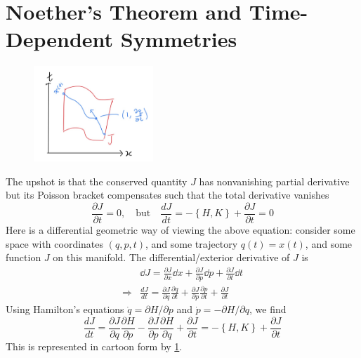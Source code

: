 \documentclass{report}
\begin{document}
\section{Noether's Theorem and Time-Dependent Symmetries}
\begin{figure}
	\begin{center}
		\includegraphics[width=0.4\textwidth]{figs/september/IMG_0030.jpg}
		\caption{}
		\label{fig:poisson}
	\end{center}
	\vspace*{-4em}
\end{figure}
The upshot is that the conserved quantity $ J $ has nonvanishing partial 
derivative but its Poisson bracket compensates such that the total derivative 
vanishes
\begin{equation*}
	\frac{\partial J}{\partial t} = 0,
	\quad\text{but}\quad
	\frac{d J}{d t} = -\left\{H, K\right\} + \frac{\partial J}{\partial t}= 0
\end{equation*}
Here is a differential geometric way of viewing the above equation: consider 
some space with coordinates $ (q,p,t) $, and some trajectory $ q(t) = x(t)  $, and some 
function $ J $ on this manifold. The differential/exterior derivative of $ J $ 
is 
\begin{align*}
	&\dd{J} = \frac{\partial J}{\partial x}\dd{x} + \frac{\partial J}{\partial p}\dd{p}
	+ \frac{\partial J}{\partial t}\dd{t}\\
		\Longrightarrow  &\frac{d J}{d t} = \frac{\partial J}{\partial q} \frac{\partial q}{\partial t}
			+ \frac{\partial J}{\partial p} \frac{\partial p}{\partial t}
			+ \frac{\partial J}{\partial t}
\end{align*}
Using Hamilton's equations $ \dot{q} = \partial H / \partial p $ and 
$ \dot{p} = - \partial H/ \partial q $, we find 
\begin{equation}\label{eq:eom}
	\frac{d J}{d t} = \frac{\partial J}{\partial q} \frac{\partial H}{\partial p}
		- \frac{\partial J}{\partial p} \frac{\partial H}{\partial q}
		+ \frac{\partial J}{\partial t}
		= -\left\{H,K\right\} + \frac{\partial J}{\partial t}
\end{equation}
This is represented in cartoon form by \cref{fig:poisson}.
\end{document}
